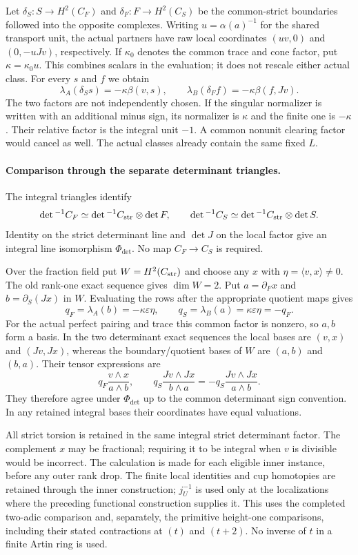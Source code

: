 Let $\delta_S:S\to H^2(C_F)$ and $\delta_F:F\to H^2(C_S)$ be
the common-strict boundaries followed into the opposite complexes.
Writing $u=\alpha(a)^{-1}$ for the shared transport unit, the actual
partners have raw local coordinates $(uv,0)$ and $(0,-uJv)$,
respectively. If $\kappa_0$ denotes the common trace and cone factor,
put $\kappa=\kappa_0u$. This combines scalars in the evaluation;
it does not rescale either actual class. For every $s$ and $f$ we obtain
\[
 \lambda_A(\delta_Ss)=-\kappa\beta(v,s),\qquad
 \lambda_B(\delta_Ff)=-\kappa\beta(f,Jv).
\]
The two factors are not independently chosen. If the singular
normalizer is written with an additional minus sign, its normalizer
is $\kappa$ and the finite one is $-\kappa$. Their relative factor is
the integral unit $-1$. A common nonunit clearing factor would cancel
as well. The actual classes already contain the same fixed $L$.

\paragraph{Comparison through the separate determinant triangles.}
The integral triangles identify
\[
 \det{}^{-1}C_F\simeq\det{}^{-1}C_{\rm str}\otimes\det F,
 \qquad
 \det{}^{-1}C_S\simeq\det{}^{-1}C_{\rm str}\otimes\det S.
\]
Identity on the strict determinant line and $\det J$ on the local
factor give an integral line isomorphism $\Phi_{\det}$. No map
$C_F\to C_S$ is required.

Over the fraction field put $W=H^2(C_{\rm str})$ and choose any
$x$ with $\eta=\langle v,x\rangle\ne0$. The old rank-one exact
sequence gives $\dim W=2$. Put
$a=\partial_Fx$ and $b=\partial_S(Jx)$ in $W$. Evaluating the rows
after the appropriate quotient maps gives
\[
 q_F=\lambda_A(b)=-\kappa\varepsilon\eta,\qquad
 q_S=\lambda_B(a)=\kappa\varepsilon\eta=-q_F.
\]
For the actual perfect pairing and trace this common factor is nonzero,
so $a,b$ form a basis. In the two determinant exact sequences the
local bases are $(v,x)$ and $(Jv,Jx)$, whereas the boundary/quotient
bases of $W$ are $(a,b)$ and $(b,a)$. Their tensor expressions are
\[
 q_F\frac{v\wedge x}{a\wedge b},\qquad
 q_S\frac{Jv\wedge Jx}{b\wedge a}
       =-q_S\frac{Jv\wedge Jx}{a\wedge b}.
\]
They therefore agree under $\Phi_{\det}$ up to the common determinant
sign convention. In any retained integral bases their coordinates
have equal valuations.

All strict torsion is retained in the same integral strict determinant
factor. The complement $x$ may be fractional; requiring it to be
integral when $v$ is divisible would be incorrect. The calculation is
made for each eligible inner instance, before any outer rank drop.
The finite local identities and cup homotopies are retained through
the inner construction; $j_U^{-1}$ is used only at the localizations
where the preceding functional construction supplies it. This uses
the completed two-adic comparison and, separately, the primitive
height-one comparisons, including their stated contractions at
$(t)$ and $(t+2)$. No inverse of $t$ in a finite Artin ring is used.
